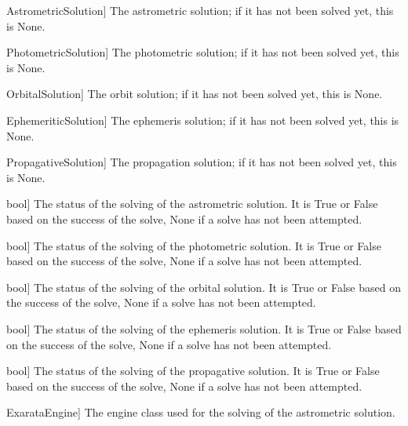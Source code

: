 \documentclass[letterpaper,11pt,english]{sphinxmanual}
\begin{document}
\begin{savenotes}
\begin{fulllineitems}
\begin{savenotes}
\begin{fulllineitems}
\begin{quote}
\begin{description}
\end{description}\end{quote}

\end{fulllineitems}\end{savenotes}

\begin{description}
\sphinxlineitem{astrometrics}{[}AstrometricSolution{]}
\sphinxAtStartPar
The astrometric solution; if it has not been solved yet, this is None.

\sphinxlineitem{photometrics}{[}PhotometricSolution{]}
\sphinxAtStartPar
The photometric solution; if it has not been solved yet, this is None.

\sphinxlineitem{orbitals}{[}OrbitalSolution{]}
\sphinxAtStartPar
The orbit solution; if it has not been solved yet, this is None.

\sphinxlineitem{ephemeritics}{[}EphemeriticSolution{]}
\sphinxAtStartPar
The ephemeris solution; if it has not been solved yet, this is None.

\sphinxlineitem{propagatives}{[}PropagativeSolution{]}
\sphinxAtStartPar
The propagation solution; if it has not been solved yet, this is None.

\sphinxlineitem{astrometrics\_status}{[}bool{]}
\sphinxAtStartPar
The status of the solving of the astrometric solution. It is True or
False based on the success of the solve, None if a solve has not
been attempted.

\sphinxlineitem{photometrics\_status}{[}bool{]}
\sphinxAtStartPar
The status of the solving of the photometric solution. It is True or
False based on the success of the solve, None if a solve has not
been attempted.

\sphinxlineitem{orbitals\_status}{[}bool{]}
\sphinxAtStartPar
The status of the solving of the orbital solution. It is True or
False based on the success of the solve, None if a solve has not
been attempted.

\sphinxlineitem{ephemeritics\_status}{[}bool{]}
\sphinxAtStartPar
The status of the solving of the ephemeris solution. It is True or
False based on the success of the solve, None if a solve has not
been attempted.

\sphinxlineitem{propagatives\_status}{[}bool{]}
\sphinxAtStartPar
The status of the solving of the propagative solution. It is True or
False based on the success of the solve, None if a solve has not
been attempted.

\sphinxlineitem{astrometrics\_engine\_class}{[}ExarataEngine{]}
\sphinxAtStartPar
The engine class used for the solving of the astrometric solution.


\end{description}
\end{fulllineitems}
\end{savenotes}
\end{document}
